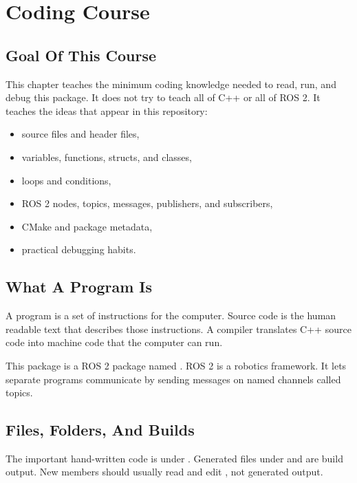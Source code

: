 \chapter{Coding Course}

\section{Goal Of This Course}

This chapter teaches the minimum coding knowledge needed to read, run, and
debug this package. It does not try to teach all of C++ or all of ROS 2. It
teaches the ideas that appear in this repository:

\begin{itemize}
  \item source files and header files,
  \item variables, functions, structs, and classes,
  \item loops and conditions,
  \item ROS 2 nodes, topics, messages, publishers, and subscribers,
  \item CMake and package metadata,
  \item practical debugging habits.
\end{itemize}

\section{What A Program Is}

A program is a set of instructions for the computer. Source code is the human
readable text that describes those instructions. A compiler translates C++
source code into machine code that the computer can run.

This package is a ROS 2 package named \repo. ROS 2 is a robotics framework. It
lets separate programs communicate by sending messages on named channels called
topics.

\section{Files, Folders, And Builds}

The important hand-written code is under . Generated files under
 and  are build output. New members should usually
read and edit , not generated output.

